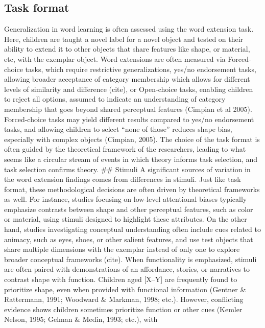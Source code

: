 \documentclass[10pt, letterpaper]{article}
\begin{document}
\hypertarget{task-format}{%
\subsection{Task format}\label{task-format}}

Generalization in word learning is often assessed using the word
extension task. Here, children are taught a novel label for a novel
object and tested on their ability to extend it to other objects that
share features like shape, or material, etc, with the exemplar object.
Word extensions are often measured via Forced-choice tasks, which
require restrictive generalizations, yes/no endorsement tasks, allowing
broader acceptance of category membership which allows for different
levels of similarity and difference (cite), or Open-choice tasks,
enabling children to reject all options, assumed to indicate an
understanding of category membership that goes beyond shared perceptual
features (Cimpian et al 2005). Forced-choice tasks may yield different
results compared to yes/no endorsement tasks, and allowing children to
select ``none of those'' reduces shape bias, especially with complex
objects (Cimpian, 2005). The choice of the task format is often guided
by the theoretical framework of the researchers, leading to what seems
like a circular stream of events in which theory informs task selection,
and task selection confirms theory. \#\# Stimuli A significant sources
of variation in the word extension findings comes from differences in
stimuli. Just like task format, these methodological decisions are often
driven by theoretical frameworks as well. For instance, studies focusing
on low-level attentional biases typically emphasize contrasts between
shape and other perceptual features, such as color or material, using
stimuli designed to highlight these attributes. On the other hand,
studies investigating conceptual understanding often include cues
related to animacy, such as eyes, shoes, or other salient features, and
use test objects that share multiple dimensions with the exemplar
instead of only one to explore broader conceptual frameworks (cite).
When functionality is emphasized, stimuli are often paired with
demonstrations of an affordance, stories, or narratives to contrast
shape with function. Children aged {[}X--Y{]} are frequently found to
prioritize shape, even when provided with functional information
(Gentner \& Rattermann, 1991; Woodward \& Markman, 1998; etc.). However,
conflicting evidence shows children sometimes prioritize function or
other cues (Kemler Nelson, 1995; Gelman \& Medin, 1993; etc.), with
\end{document}
